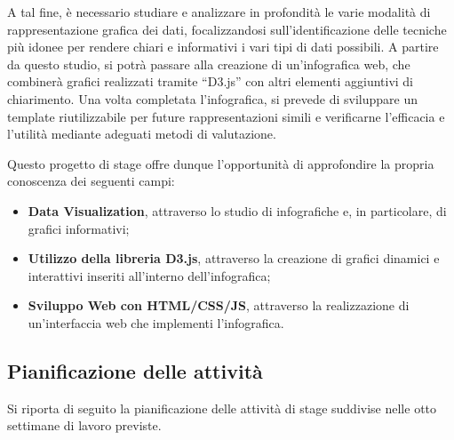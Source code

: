 A tal fine, è necessario studiare e analizzare in profondità le varie modalità di rappresentazione
grafica dei dati, focalizzandosi sull'identificazione delle tecniche più idonee per rendere chiari e
informativi i vari tipi di dati possibili. A partire da questo studio, si potrà passare alla creazione di un'infografica
web, che combinerà grafici realizzati tramite ``D3.js'' con altri elementi aggiuntivi di chiarimento. Una
volta completata l'infografica, si prevede di sviluppare un template riutilizzabile per future rappresentazioni
simili e verificarne l'efficacia e l'utilità mediante adeguati metodi di valutazione. 

Questo progetto di stage offre dunque l'opportunità di approfondire la propria conoscenza dei seguenti campi:
\begin{itemize}
    \item \textbf{Data Visualization}, attraverso lo studio di infografiche e, in particolare, di grafici informativi;
    \item \textbf{Utilizzo della libreria D3.js}, attraverso la creazione di grafici dinamici e interattivi inseriti all'interno dell'infografica;
    \item \textbf{Sviluppo Web con HTML/CSS/JS}, attraverso la realizzazione di un'interfaccia web che implementi l'infografica.
\end{itemize}

\subsection{Pianificazione delle attività}
Si riporta di seguito la pianificazione delle attività di stage suddivise 
nelle otto settimane di lavoro previste.

